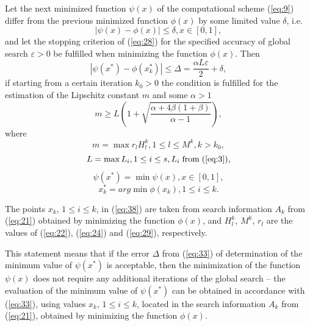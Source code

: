 \documentclass[smallextended]{svjour3}       %
\begin{document}
\begin{theorem}
Let the next minimized function $\psi(x)$ of the computational scheme (\ref{eq:9}) differ from the previous minimized function $\phi(x)$ by some limited value $\delta$, i.e.
\begin{equation}\label{eq:32}
|\psi(x)-\phi(x)| \leq \delta, x \in [0,1],
\end{equation}
and let the stopping criterion of (\ref{eq:28}) for the specified accuracy of global search $\varepsilon>0$ be fulfilled when minimizing the function $\phi(x)$. Then 
\begin{equation}\label{eq:33}
|\psi(x^*)-\phi(x_k^*)| \leq \Delta = \frac{\alpha L \varepsilon}{2} + \delta,
\end{equation}
if starting from a certain iteration $k_0>0$ the condition is fulfilled for the estimation of the Lipschitz constant $m$ and some $\alpha > 1$
\begin{equation}\label{eq:34}
m \geq L (1+ \sqrt{\frac{\alpha + 4 \beta (1 + \beta)}{\alpha - 1}}),
\end{equation}
where
\begin{equation}\label{eq:35}
m=\max{r_l H_l^k}, 1 \leq l \leq M^k, k>k_0,
\end{equation}
\begin{equation}\label{eq:36}
L=\max{L_i}, 1 \leq i \leq s, L_i\; \text{from}\; (\ref{eq:3}),
\end{equation}
\begin{equation}\label{eq:37}
\psi(x^*)=\min{\psi(x)},x \in [0,1],
\end{equation}
\begin{equation}\label{eq:38}
x_k^* = arg \min{\phi(x_k)}, 1 \leq i \leq k.
\end{equation}
\end{theorem}
The points $x_k$, $1 \leq i \leq k$, in (\ref{eq:38}) are taken from search information $A_k$ from (\ref{eq:21}) obtained by minimizing the function $\phi(x)$, and $H_l^k$, $M^k$, $r_l$ are the values of (\ref{eq:22}), (\ref{eq:24}) and (\ref{eq:29}), respectively.

This statement means that if the error $\Delta$ from (\ref{eq:33}) of determination of the minimum value of $\psi(x^*)$ is acceptable, then the minimization of the function $\psi(x)$ does not require any additional iterations of the global search -- the evaluation of the minimum value of $\psi(x^*)$ can be obtained in accordance with (\ref{eq:33}), using values $x_k$, ${1 \leq i \leq k}$, located in the search information $A_k$ from (\ref{eq:21}), obtained by minimizing the function $\phi(x)$.
\end{document}

